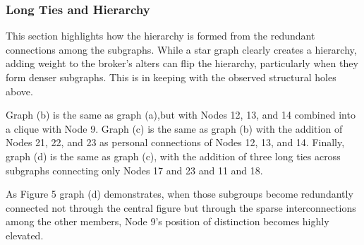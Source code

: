 
\subsubsection{Long Ties and Hierarchy}


This section highlights how the hierarchy is formed from the redundant connections among the subgraphs. While a star graph clearly creates a hierarchy, adding weight to the broker's alters can flip the hierarchy, particularly when they form denser subgraphs. This is in keeping with the observed structural holes above. 

Graph (b) is the same as graph (a),but with Nodes 12, 13, and 14 combined into a clique with Node 9. Graph (c) is the same as graph (b) with the addition of Nodes 21, 22, and 23 as personal connections of Nodes 12, 13, and 14. Finally, graph (d) is the same as graph (c), with the addition of three long ties across subgraphs connecting only Nodes 17 and 23 and 11 and 18.

As Figure 5 graph (d) demonstrates, when those subgroups become redundantly connected not through the central figure but through the sparse interconnections among the other members, Node 9's position of distinction becomes highly elevated.

